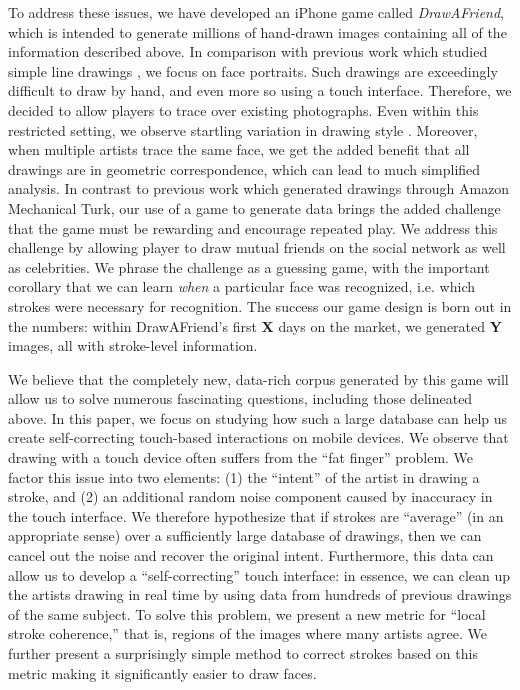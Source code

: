To address these issues, we have developed an iPhone game called
\emph{DrawAFriend}, which is intended to generate millions of
hand-drawn images containing all of the information described above.
In comparison with previous work which studied simple line drawings
, we focus on face portraits.
Such drawings are exceedingly difficult to draw by hand, and even
more so using a touch interface. Therefore, we decided to allow
players to trace over existing photographs. Even within this
restricted setting, we observe startling variation in drawing style
. Moreover, when
multiple artists trace the same face, we get the added benefit that
all drawings are in geometric correspondence, which can lead to much
simplified analysis. In contrast to previous work which generated
drawings through Amazon Mechanical Turk, our use of a game to
generate data brings the added challenge that the game must be
rewarding and encourage repeated play. We address this challenge by
allowing player to draw mutual friends on the social network as well
as celebrities. We phrase the challenge as a guessing game, with the
important corollary that we can learn \emph{when} a particular face
was recognized, i.e. which strokes were necessary for recognition.
The success our game design is born out in the numbers: within
DrawAFriend's first \textbf{X} days on the market, we generated
\textbf{Y} images, all with stroke-level information.

We believe that the completely new, data-rich corpus generated by
this game will allow us to solve numerous fascinating questions,
including those delineated above. In this paper, we focus on
studying how such a large database can help us create
self-correcting touch-based interactions on mobile devices. We
observe that drawing with a touch device often suffers from the
``fat finger'' problem. We factor this issue into two elements: (1)
the ``intent'' of the artist in drawing a stroke, and (2) an
additional random noise component caused by inaccuracy in the touch
interface. We therefore hypothesize that if strokes are ``average''
(in an appropriate sense) over a sufficiently large database of
drawings, then we can cancel out the noise and recover the original
intent. Furthermore, this data can allow us to develop a
``self-correcting'' touch interface: in essence, we can clean up the
artists drawing in real time by using data from hundreds of previous
drawings of the same subject. To solve this problem, we present a
new metric for ``local stroke coherence,'' that is, regions of the
images where many artists agree. We further present a surprisingly
simple method to correct strokes based on this metric making it
significantly easier to draw faces.

